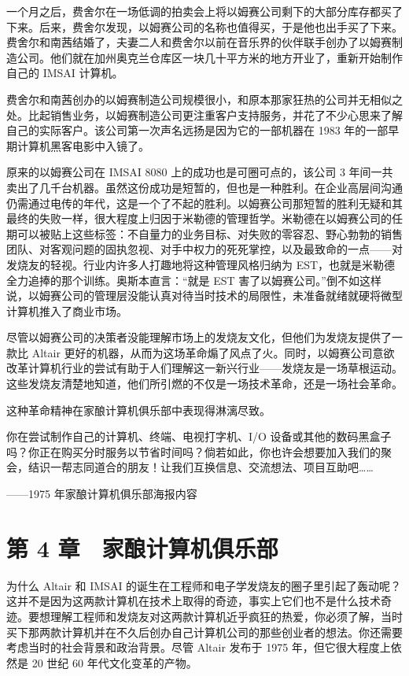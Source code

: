 \documentclass[12pt,UTF8]{ctexbook}
\begin{document}
一个月之后，费舍尔在一场低调的拍卖会上将以姆赛公司剩下的大部分库存都买了下来。后来，费舍尔发现，以姆赛公司的名称也值得买，于是他也出手买了下来。费舍尔和南茜结婚了，夫妻二人和费舍尔以前在音乐界的伙伴联手创办了以姆赛制造公司。他们就在加州奥克兰仓库区一块几十平方米的地方开业了，重新开始制作自己的 IMSAI 计算机。

费舍尔和南茜创办的以姆赛制造公司规模很小，和原本那家狂热的公司并无相似之处。比起销售业务，以姆赛制造公司更注重客户支持服务，并花了不少心思来了解自己的实际客户。该公司第一次声名远扬是因为它的一部机器在 1983 年的一部早期计算机黑客电影中入镜了。

原来的以姆赛公司在 IMSAI 8080 上的成功也是可圈可点的，该公司 3 年间一共卖出了几千台机器。虽然这份成功是短暂的，但也是一种胜利。在企业高层间沟通仍需通过电传的年代，这是一个了不起的胜利。以姆赛公司那短暂的胜利无疑和其最终的失败一样，很大程度上归因于米勒德的管理哲学。米勒德在以姆赛公司的任期可以被贴上这些标签：不自量力的业务目标、对失败的零容忍、野心勃勃的销售团队、对客观问题的固执忽视、对手中权力的死死掌控，以及最致命的一点——对发烧友的轻视。行业内许多人打趣地将这种管理风格归纳为 EST，也就是米勒德全力追捧的那个训练。奥斯本直言：“就是 EST 害了以姆赛公司。”倒不如这样说，以姆赛公司的管理层没能认真对待当时技术的局限性，未准备就绪就硬将微型计算机推入了商业市场。

尽管以姆赛公司的决策者没能理解市场上的发烧友文化，但他们为发烧友提供了一款比 Altair 更好的机器，从而为这场革命煽了风点了火。同时，以姆赛公司意欲改革计算机行业的尝试有助于人们理解这一新兴行业——发烧友是一场草根运动。这些发烧友清楚地知道，他们所引燃的不仅是一场技术革命，还是一场社会革命。

这种革命精神在家酿计算机俱乐部中表现得淋漓尽致。





你在尝试制作自己的计算机、终端、电视打字机、I/O 设备或其他的数码黑盒子吗？你正在购买分时服务以节省时间吗？倘若如此，你也许会想要加入我们的聚会，结识一帮志同道合的朋友！让我们互换信息、交流想法、项目互助吧……

——1975 年家酿计算机俱乐部海报内容





\chapter{第 4 章　家酿计算机俱乐部}


为什么 Altair 和 IMSAI 的诞生在工程师和电子学发烧友的圈子里引起了轰动呢？这并不是因为这两款计算机在技术上取得的奇迹，事实上它们也不是什么技术奇迹。要想理解工程师和发烧友对这两款计算机近乎疯狂的热爱，你必须了解，当时买下那两款计算机并在不久后创办自己计算机公司的那些创业者的想法。你还需要考虑当时的社会背景和政治背景。尽管 Altair 发布于 1975 年，但它很大程度上依然是 20 世纪 60 年代文化变革的产物。
\end{document}
